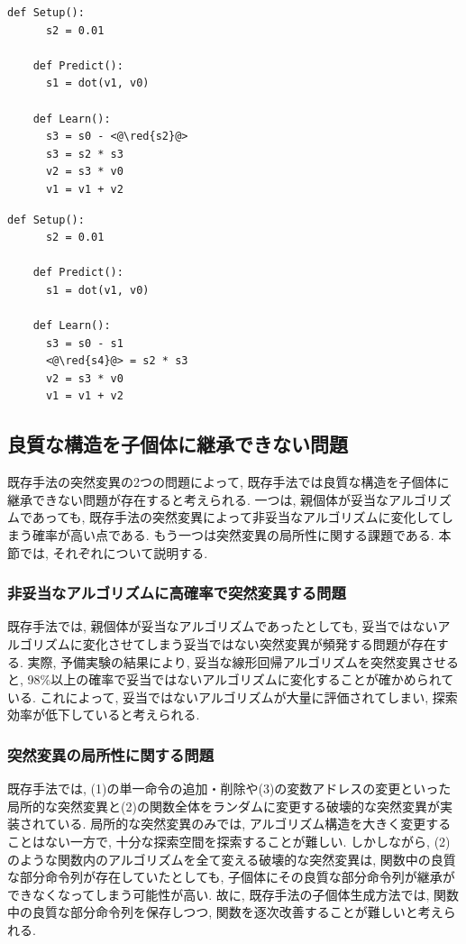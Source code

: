 \documentclass[11pt,oneside,openany,report]{jsbook}
\newcommand{\red}[1]{\textcolor{red}{#1}}
\begin{document}
\begin{multicols}{2}
  \begin{lstlisting}[caption=妥当なアルゴリズムの条件1の(c)を満たさない非妥当なアルゴリズム. ,label=code:invalid_algorithm_6]
    def Setup():
      s2 = 0.01

    def Predict():
      s1 = dot(v1, v0)

    def Learn():
      s3 = s0 - <@\red{s2}@>
      s3 = s2 * s3
      v2 = s3 * v0
      v1 = v1 + v2
  \end{lstlisting}

  \columnbreak

  \begin{lstlisting}[caption=妥当なアルゴリズムの条件3を満たさない非妥当なアルゴリズム,label=code:invalid_algorithm_7]
    def Setup():
      s2 = 0.01

    def Predict():
      s1 = dot(v1, v0)

    def Learn():
      s3 = s0 - s1
      <@\red{s4}@> = s2 * s3
      v2 = s3 * v0
      v1 = v1 + v2
  \end{lstlisting}
\end{multicols}

\subsection{良質な構造を子個体に継承できない問題}\label{subsec:problem:existing_problem:mutation}

既存手法の突然変異の2つの問題によって, 既存手法では良質な構造を子個体に継承できない問題が存在すると考えられる. 一つは, 親個体が妥当なアルゴリズムであっても, 既存手法の突然変異によって非妥当なアルゴリズムに変化してしまう確率が高い点である. もう一つは突然変異の局所性に関する課題である. 本節では, それぞれについて説明する.

\subsubsection{非妥当なアルゴリズムに高確率で突然変異する問題}
既存手法では, 親個体が妥当なアルゴリズムであったとしても, 妥当ではないアルゴリズムに変化させてしまう妥当ではない突然変異が頻発する問題が存在する. 実際, 予備実験の結果により, 妥当な線形回帰アルゴリズムを突然変異させると, 98\%以上の確率で妥当ではないアルゴリズムに変化することが確かめられている. これによって, 妥当ではないアルゴリズムが大量に評価されてしまい, 探索効率が低下していると考えられる.

\subsubsection{突然変異の局所性に関する問題}
既存手法では, (1)の単一命令の追加・削除や(3)の変数アドレスの変更といった局所的な突然変異と(2)の関数全体をランダムに変更する破壊的な突然変異が実装されている. 局所的な突然変異のみでは, アルゴリズム構造を大きく変更することはない一方で, 十分な探索空間を探索することが難しい. しかしながら, (2)のような関数内のアルゴリズムを全て変える破壊的な突然変異は, 関数中の良質な部分命令列が存在していたとしても, 子個体にその良質な部分命令列が継承ができなくなってしまう可能性が高い. 故に, 既存手法の子個体生成方法では, 関数中の良質な部分命令列を保存しつつ, 関数を逐次改善することが難しいと考えられる.
\end{document}
